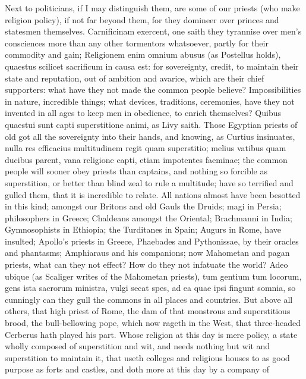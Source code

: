 {Next to politicians, if I may distinguish them, are some of our priests
(who make religion policy), if not far beyond them, for they domineer
over princes and statesmen themselves. Carnificinam exercent, one saith
they tyrannise over men's consciences more than any other tormentors
whatsoever, partly for their commodity and gain; Religionem enim omnium
abusus (as Postellus holds), quaestus scilicet sacrificum in
causa est: for sovereignty, credit, to maintain their state and
reputation, out of ambition and avarice, which are their chief
supporters: what have they not made the common people believe?
Impossibilities in nature, incredible things; what devices, traditions,
ceremonies, have they not invented in all ages to keep men in
obedience, to enrich themselves? Quibus quaestui sunt capti
superstitione animi, as Livy saith. Those Egyptian priests of old
got all the sovereignty into their hands, and knowing, as Curtius
insinuates, nulla res efficacius multitudinem regit quam superstitio;
melius vatibus quam ducibus parent, vana religione capti, etiam
impotentes faeminae; the common people will sooner obey priests than
captains, and nothing so forcible as superstition, or better than blind
zeal to rule a multitude; have so terrified and gulled them, that it is
incredible to relate. All nations almost have been besotted in this
kind; amongst our Britons and old Gauls the Druids; magi in Persia;
philosophers in Greece; Chaldeans amongst the Oriental; Brachmanni in
India; Gymnosophists in Ethiopia; the Turditanes in Spain; Augurs in
Rome, have insulted; Apollo's priests in Greece, Phaebades and
Pythonissae, by their oracles and phantasms; Amphiaraus and his
companions; now Mahometan and pagan priests, what can they not effect?
How do they not infatuate the world? Adeo ubique (as Scaliger
writes of the Mahometan priests), tum gentium tum locorum, gens ista
sacrorum ministra, vulgi secat spes, ad ea quae ipsi fingunt somnia, so
cunningly can they gull the commons in all places and countries. But
above all others, that high priest of Rome, the dam of that monstrous
and superstitious brood, the bull-bellowing pope, which now rageth in
the West, that three-headed Cerberus hath played his part.  Whose
religion at this day is mere policy, a state wholly composed of
superstition and wit, and needs nothing but wit and superstition to
maintain it, that useth colleges and religious houses to as good
purpose as forts and castles, and doth more at this day by a company of
}
